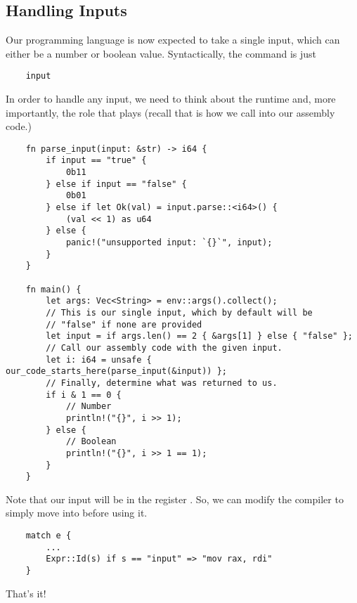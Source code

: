 \documentclass[letterpaper]{article}
\begin{document}
\subsection{Handling Inputs}
Our programming language is now expected to take a single input, which can either be a number or boolean value. Syntactically, the command is just 
\begin{verbatim}
    input \end{verbatim}
In order to handle any input, we need to think about the runtime and, more importantly, the role that  plays (recall that  is how we call into our assembly code.)
\begin{verbatim}
    fn parse_input(input: &str) -> i64 {
        if input == "true" {
            0b11
        } else if input == "false" {
            0b01
        } else if let Ok(val) = input.parse::<i64>() {
            (val << 1) as u64
        } else {
            panic!("unsupported input: `{}`", input);
        }
    }

    fn main() {
        let args: Vec<String> = env::args().collect();
        // This is our single input, which by default will be 
        // "false" if none are provided
        let input = if args.len() == 2 { &args[1] } else { "false" };
        // Call our assembly code with the given input.
        let i: i64 = unsafe { our_code_starts_here(parse_input(&input)) };
        // Finally, determine what was returned to us.
        if i & 1 == 0 {
            // Number
            println!("{}", i >> 1);
        } else {
            // Boolean
            println!("{}", i >> 1 == 1);
        }
    }\end{verbatim}
Note that our input will be in the register . So, we can modify the compiler to simply move  into  before using it. 
\begin{verbatim}
    match e {
        ... 
        Expr::Id(s) if s == "input" => "mov rax, rdi"
    }\end{verbatim}
That's it!
\end{document}
